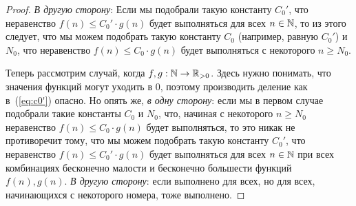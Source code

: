 \begin{enumerate}
\begin{enumerate}
\begin{proof}
        \textit{В другую сторону}:
        Если мы подобрали такую константу $C_0'$, что неравенство $f(n) \leq C_0' \cdot g(n)$ будет выполняться для всех $n \in \mathbb{N}$, то из этого следует, что мы можем подобрать такую константу $C_0$ (например, равную $C_0'$) и $N_0$, что неравенство $f(n) \leq C_0 \cdot g(n)$ будет выполняться с некоторого $n \geq N_0$.

        Теперь рассмотрим случай, когда $f, g: \mathbb{N} \to \mathbb{R}_{>0}$. Здесь нужно понимать, что значения функций могут уходить в 0, поэтому производить деление как в~(\ref{eq:c0'}) опасно. Но опять же, \textit{в одну сторону}: если мы в первом случае подобрали такие константы $C_0$ и $N_0$, что, начиная с некоторого $n \geq N_0$ неравенство $f(n) \leq C_0 \cdot g(n)$ будет выполняться, то это никак не противоречит тому, что мы можем подобрать такую константу $C_0'$, что неравенство $f(n) \leq C_0' \cdot g(n)$ будет выполняться для всех $n \in \mathbb{N}$ при всех комбинациях бесконечно малости и бесконечно большести функций $f(n), g(n)$. \textit{В другую сторону}: если выполнено для всех, но для всех, начинающихся с некоторого номера, тоже выполнено.





\end{proof}
\end{enumerate}
\end{enumerate}
